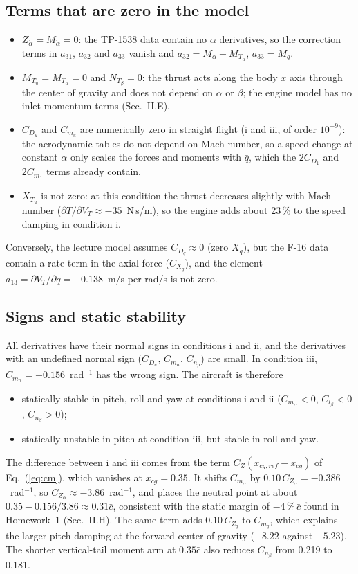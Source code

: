 \documentclass[conf]{new-aiaa}
\begin{document}
\subsection{Terms that are zero in the model}
\begin{itemize}
\item $Z_{\dot\alpha}=M_{\dot\alpha}=0$: the TP-1538 data contain no $\dot\alpha$ derivatives, so the correction terms in $a_{31}$, $a_{32}$ and $a_{33}$ vanish and $a_{32}=M_\alpha+M_{T_\alpha}$, $a_{33}=M_q$.
\item $M_{T_u}=M_{T_\alpha}=0$ and $N_{T_\beta}=0$: the thrust acts along the body $x$ axis through the center of gravity and does not depend on $\alpha$ or $\beta$; the engine model has no inlet momentum terms (Sec.~II.E).
\item $C_{D_u}$ and $C_{m_u}$ are numerically zero in straight flight (i and iii, of order $10^{-9}$): the aerodynamic tables do not depend on Mach number, so a speed change at constant $\alpha$ only scales the forces and moments with $\bar q$, which the $2C_{D_1}$ and $2C_{m_1}$ terms already contain.
\item $X_{T_u}$ is not zero: at this condition the thrust decreases slightly with Mach number ($\partial T/\partial V_T\approx-35$~N\,s/m), so the engine adds about 23\,\% to the speed damping in condition i.
\end{itemize}
Conversely, the lecture model assumes $C_{D_q}\approx0$ (zero $X_q$), but the F-16 data contain a rate term in the axial force ($C_{X_q}$), and the element $a_{13}=\partial\dot V_T/\partial q=-0.138$~m/s per rad/s is not zero.

\subsection{Signs and static stability}
All derivatives have their normal signs in conditions i and ii, and the derivatives with an undefined normal sign ($C_{D_u}$, $C_{m_u}$, $C_{n_p}$) are small. In condition iii, $C_{m_\alpha}=+0.156$~rad$^{-1}$ has the wrong sign. The aircraft is therefore
\begin{itemize}
\item statically stable in pitch, roll and yaw at conditions i and ii ($C_{m_\alpha}<0$, $C_{l_\beta}<0$, $C_{n_\beta}>0$);
\item statically unstable in pitch at condition iii, but stable in roll and yaw.
\end{itemize}
The difference between i and iii comes from the term $C_Z(x_{cg,ref}-x_{cg})$ of Eq.~(\ref{eq:cm}), which vanishes at $x_{cg}=0.35$. It shifts $C_{m_\alpha}$ by $0.10\,C_{Z_\alpha}=-0.386$~rad$^{-1}$, so $C_{Z_\alpha}\approx-3.86$~rad$^{-1}$, and places the neutral point at about $0.35-0.156/3.86\approx0.31\bar c$, consistent with the static margin of $-4\,\%\,\bar c$ found in Homework~1 (Sec.~II.H). The same term adds $0.10\,C_{Z_q}$ to $C_{m_q}$, which explains the larger pitch damping at the forward center of gravity ($-8.22$ against $-5.23$). The shorter vertical-tail moment arm at $0.35\bar c$ also reduces $C_{n_\beta}$ from 0.219 to 0.181.
\end{document}
